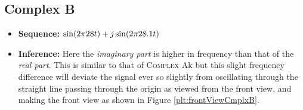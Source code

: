 \documentclass[../../course]{subfiles}
\begin{document}
\subsection{Complex B}

\begin{itemize} [label=]

    \item \textbf{Sequence:} $\sin(2 \pi 28 t) + j \sin(2 \pi 28.1 t)$

    \item \textbf{Inference:} Here the \emph{imaginary part} is higher in frequency than
        that of the \emph{real part}. This is similar to that of \textsc{Complex A}k but
        this slight frequency difference will deviate the signal ever so slightly from
        oscillating through the straight line passing through the origin as viewed from
        the front view, and making the front view as shown in Figure \ref{plt:frontViewCmplxB}.

\end{itemize}
\end{document}

